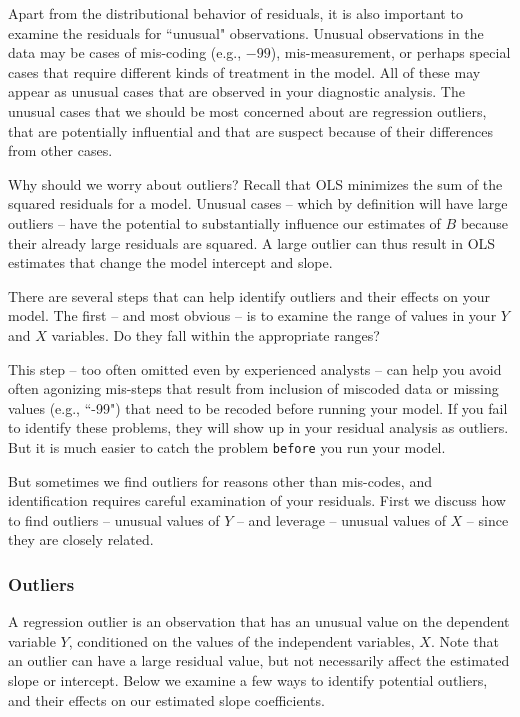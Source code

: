 \documentclass[11pt,openany]{book}\usepackage[]{graphicx}\usepackage[]{color}
\begin{document}
Apart from the distributional behavior of residuals, it is also important to examine the residuals for ``unusual" observations. Unusual observations in the data may be cases of mis-coding (e.g., $-99$), mis-measurement, or perhaps special cases that require different kinds of treatment in the model. All of these may appear as unusual cases that are observed in your diagnostic analysis. The unusual cases that we should be most concerned about are regression outliers, that are potentially influential and that are suspect because of their differences from other cases.

Why should we worry about outliers? Recall that OLS minimizes the sum of the squared residuals for a model. Unusual cases -- which by definition will have large outliers -- have the potential to substantially influence our estimates of $B$ because their already large residuals are squared. A large outlier can thus result in OLS estimates that change the model intercept and slope.

There are several steps that can help identify outliers and their effects on your model. The first -- and most obvious -- is to examine the range of values in your $Y$ and $X$ variables. Do they fall within the appropriate ranges?

This step -- too often omitted even by experienced analysts -- can help you avoid often agonizing mis-steps that result from inclusion of miscoded data or missing values (e.g., ``-99") that need to be recoded before running your model. If you fail to identify these problems, they will show up in your residual analysis as outliers. But it is much easier to catch the problem \texttt{before} you run your model.

But sometimes we find outliers for reasons other than mis-codes, and identification requires careful examination of your residuals.  First we discuss how to find outliers -- unusual values of $Y$ -- and leverage -- unusual values of $X$ -- since they are closely related.  

\subsubsection{Outliers}

A regression outlier is an observation that has an unusual value on the dependent variable $Y$, conditioned on the values of the independent variables, $X$. Note that an outlier can have a large residual value, but not necessarily affect the estimated slope or intercept. Below we examine a few ways to identify potential outliers, and their effects on our estimated slope coefficients.   
\end{document}
